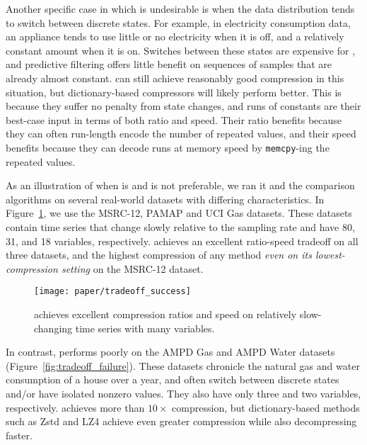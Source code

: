 Another specific case in which \minesp is undesirable is when the data distribution tends to switch between discrete states. For example, in electricity consumption data, an appliance tends to use little or no electricity when it is off, and a relatively constant amount when it is on. Switches between these states are expensive for \mine, and predictive filtering offers little benefit on sequences of samples that are already almost constant. \minesp can still achieve reasonably good compression in this situation, but dictionary-based compressors will likely perform better. This is because they suffer no penalty from state changes, and runs of constants are their best-case input in terms of both ratio and speed. Their ratio benefits because they can often run-length encode the number of repeated values, and their speed benefits because they can decode runs at memory speed by \texttt{memcpy}-ing the repeated values.

As an illustration of when \minesp is and is not preferable, we ran it and the comparison algorithms on several real-world datasets with differing characteristics. In Figure~\ref{fig:tradeoff_success}, we use the MSRC-12, PAMAP and UCI Gas datasets. These datasets contain time series that change slowly relative to the sampling rate and have 80, 31, and 18 variables, respectively. \minesp achieves an excellent ratio-speed tradeoff on all three datasets, and the highest compression of any method \textit{even on its lowest-compression setting} on the MSRC-12 dataset.

\begin{figure}[h]
\begin{center}
    \texttt{[image: paper/tradeoff\_success]}
    \caption{\minesp achieves excellent compression ratios and speed on relatively slow-changing time series with many variables.}
    \label{fig:tradeoff_success}
\end{center}
\end{figure}

In contrast, \minesp performs poorly on the AMPD Gas and AMPD Water datasets (Figure~\ref{fig:tradeoff_failure}). These datasets chronicle the natural gas and water consumption of a house over a year, and often switch between discrete states and/or have isolated nonzero values. They also have only three and two variables, respectively. \minesp achieves more than $10\times$ compression, but dictionary-based methods such as Zstd and LZ4 achieve even greater compression while also decompressing faster.


